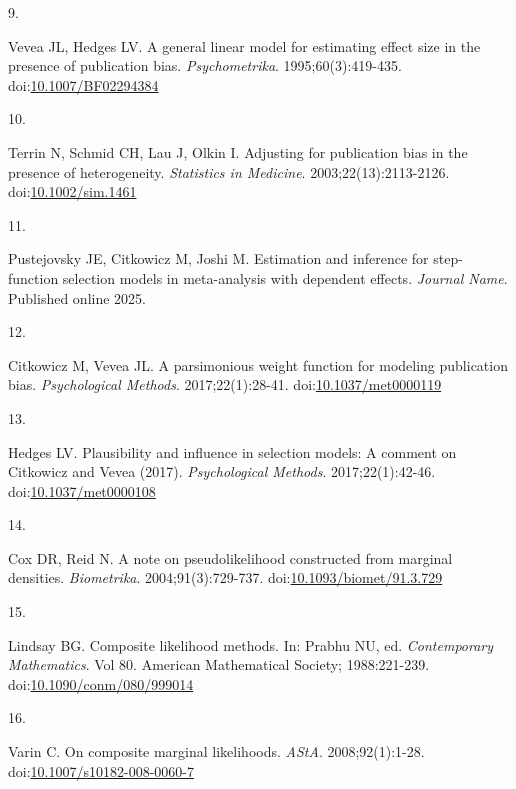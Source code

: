 \documentclass[
  american,
  man, donotrepeattitle,floatsintext]{apa7}
\newlength{\cslhangindent}
\newlength{\csllabelwidth}
\newenvironment{CSLReferences}[2] %
 {\begin{list}{}{%
  \setlength{\itemindent}{0pt}
  \setlength{\leftmargin}{0pt}
  \setlength{\parsep}{0pt}
  \ifodd #1
   \setlength{\leftmargin}{\cslhangindent}
   \setlength{\itemindent}{-1\cslhangindent}
  \fi
  \setlength{\itemsep}{#2\baselineskip}}}
 {\end{list}}
\newcommand{\CSLLeftMargin}[1]{\parbox[t]{\csllabelwidth}{\strut#1\strut}}
\newcommand{\CSLRightInline}[1]{\parbox[t]{\linewidth - \csllabelwidth}{\strut#1\strut}}
\begin{document}
\begin{CSLReferences}{0}{1}
\CSLLeftMargin{9. }%
\CSLRightInline{Vevea JL, Hedges LV. A general linear model for estimating effect size in the presence of publication bias. \emph{Psychometrika}. 1995;60(3):419-435. doi:\href{https://doi.org/10.1007/BF02294384}{10.1007/BF02294384}}

\CSLLeftMargin{10. }%
\CSLRightInline{Terrin N, Schmid CH, Lau J, Olkin I. Adjusting for publication bias in the presence of heterogeneity. \emph{Statistics in Medicine}. 2003;22(13):2113-2126. doi:\href{https://doi.org/10.1002/sim.1461}{10.1002/sim.1461}}

\CSLLeftMargin{11. }%
\CSLRightInline{Pustejovsky JE, Citkowicz M, Joshi M. Estimation and inference for step-function selection models in meta-analysis with dependent effects. \emph{Journal Name}. Published online 2025.}

\CSLLeftMargin{12. }%
\CSLRightInline{Citkowicz M, Vevea JL. {A parsimonious weight function for modeling publication bias}. \emph{Psychological Methods}. 2017;22(1):28-41. doi:\href{https://doi.org/10.1037/met0000119}{10.1037/met0000119}}

\CSLLeftMargin{13. }%
\CSLRightInline{Hedges LV. Plausibility and influence in selection models: {A} comment on {Citkowicz} and {Vevea} (2017). \emph{Psychological Methods}. 2017;22(1):42-46. doi:\href{https://doi.org/10.1037/met0000108}{10.1037/met0000108}}

\CSLLeftMargin{14. }%
\CSLRightInline{Cox DR, Reid N. A note on pseudolikelihood constructed from marginal densities. \emph{Biometrika}. 2004;91(3):729-737. doi:\href{https://doi.org/10.1093/biomet/91.3.729}{10.1093/biomet/91.3.729}}

\CSLLeftMargin{15. }%
\CSLRightInline{Lindsay BG. Composite likelihood methods. In: Prabhu NU, ed. \emph{Contemporary {Mathematics}}. Vol 80. American Mathematical Society; 1988:221-239. doi:\href{https://doi.org/10.1090/conm/080/999014}{10.1090/conm/080/999014}}

\CSLLeftMargin{16. }%
\CSLRightInline{Varin C. On composite marginal likelihoods. \emph{AStA}. 2008;92(1):1-28. doi:\href{https://doi.org/10.1007/s10182-008-0060-7}{10.1007/s10182-008-0060-7}}


\end{CSLReferences}
\end{document}

